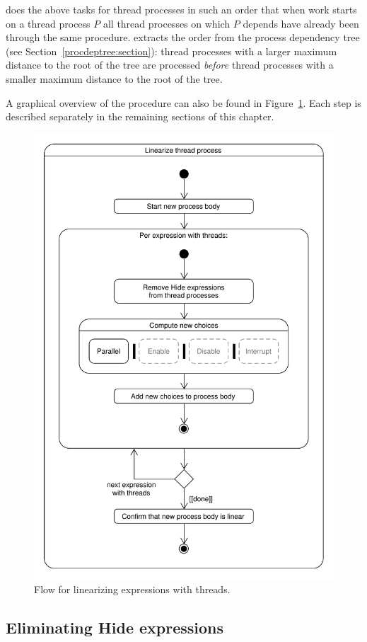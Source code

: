 \lpeq{} does the above tasks for thread processes in such an order that when work starts on a thread process $P$ all thread processes on which $P$ depends have already been through the same procedure.
\lpeq{} extracts the order from the process dependency tree (see Section~\ref{procdeptree:section}): thread processes with a larger maximum distance to the root of the tree are processed \emph{before} thread processes with a smaller maximum distance to the root of the tree.

A graphical overview of the procedure can also be found in Figure~\ref{pbranch-flow:fig}.
Each step is described separately in the remaining sections of this chapter.

\begin{figure}[!ht]
\begin{center}
\includegraphics[width=0.8\linewidth]{umlet/linearization-pbranch-flow}
\caption{Flow for linearizing expressions with threads.}
\label{pbranch-flow:fig}
\end{center}
\end{figure}

\subsection{Eliminating Hide expressions}

